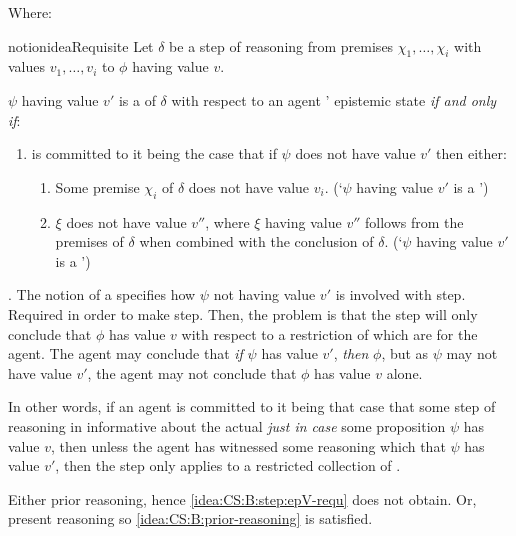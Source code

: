 \begin{note}
  Where:
  \begin{restatable}[A \requ{0}]{notion}{ideaRequisite}
    Let \(\delta\) be a step of reasoning from premises \(\chi_{1},\dots,\chi_{i}\) with values \(v_{1},\dots,v_{i}\) to \(\phi\) having value \(v\).

    \(\psi\) having value \(v'\) is a \emph{\requ{}} of \(\delta\) with respect to an agent \vAgent{}' epistemic state \emph{if and only if}:
    \begin{enumerate}[label=\circledR\arabic*., ref=(\circledR\arabic*)]
    \item \vAgent{} is committed to it being the case that if \(\psi\) does not have value \(v'\) then either:
      \begin{enumerate}[label=\alph*., ref=(\circledR2\alph*)]
      \item
        \label{notion:requ:p}
        Some premise \(\chi_{i}\) of \(\delta\) does not have value \(v_{i}\).\newline
        \mbox{}\hfill(`\(\psi\) having value \(v'\) is a \prequ{}')
      \item
        \label{notion:requ:pc}
        \(\xi\) does not have value \(v''\), where \(\xi\) having value \(v''\) follows from the premises of \(\delta\) when combined with the conclusion of \(\delta\).\newline
        \mbox{}\hfill(`\(\psi\) having value \(v'\) is a \cprequ{}')
      \end{enumerate}
    \end{enumerate}
  \end{restatable}
\end{note}

\begin{note}
  \ideaCS{}.
  The notion of a \requ{} specifies how \(\psi\) not having value \(v'\) is involved with step.
  Required in order to make step.
  Then, the problem is that the step will only conclude that \(\phi\) has value \(v\) with respect to a restriction of  which are \epVAd{} for the agent.
  The agent may conclude that \emph{if} \(\psi\) has value \(v'\), \emph{then} \(\phi\), but as \(\psi\) may not have value \(v'\), the agent may not conclude that \(\phi\) has value \(v\) alone.

  In other words, if an agent is committed to it being that case that some step of reasoning in informative about the actual \world{} \emph{just in case} some proposition \(\psi\) has value \(v\), then unless the agent has witnessed some reasoning which  that \(\psi\) has value \(v'\), then the step only applies to a restricted collection of .

  Either prior reasoning, hence \ref{idea:CS:B:step:epV-requ} does not obtain.
  Or, present reasoning so \ref{idea:CS:B:prior-reasoning} is satisfied.
\end{note}

